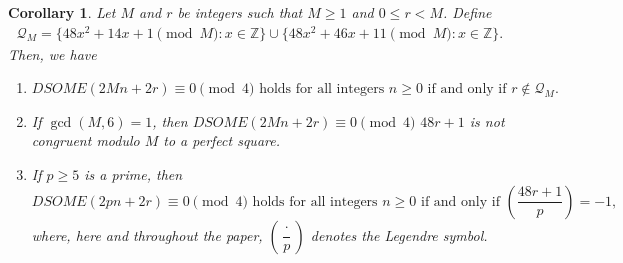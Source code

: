 \documentclass[12pt]{article}
\numberwithin{equation}{section}
\newtheorem{corollary}[theorem]{Corollary}
\theoremstyle{definition}
\theoremstyle{remark}
\numberwithin{equation}{section}
\begin{document}
\begin{corollary}\label{cor:DSOME-complete-family}
Let $M$ and $r$ be integers such that $M\geq 1$ and
$0\leq r<M$. Define
\begin{equation*}
\begin{aligned}
\mathcal{Q}_{M}
=
\{48x^{2}+14x+1\pmod{M}:x\in\mathbb{Z}\}\cup
\{48x^{2}+46x+11\pmod{M}:x\in\mathbb{Z}\}.
\end{aligned}
\end{equation*}
Then, we have
\begin{enumerate} \item[$(i)$] $DSOME(2Mn+2r)\equiv0\pmod{4} \text{  holds for all integers $n\ge0$ if and only if } r\notin\mathcal{Q}_{M}.$
    \item[$(ii)$]If $\gcd(M,6)=1$, then 
$
DSOME(2Mn+2r)\equiv0\pmod{4}$
  
$48r+1$ is not congruent modulo $M$ to a perfect square.

     \item[$(iii)$]If $p\geq5$ is a prime,  then 
$$
DSOME(2pn+2r)\equiv0\pmod{4}
\text{  holds for all integers $n\ge0$ if and only if }
\left(\dfrac{48r+1}{p}\right)=-1,
$$
where, here and throughout the paper, $\left(\dfrac{\cdot}{p}\right)$ denotes the Legendre symbol.
\end{enumerate}
\end{corollary}
\end{document}

